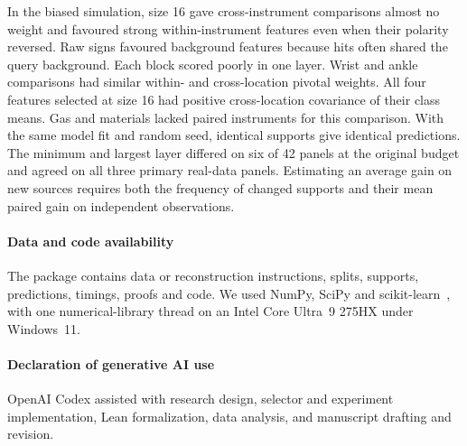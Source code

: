\documentclass{article}
\begin{document}
In the biased simulation, size 16 gave cross-instrument comparisons almost no weight and favoured strong within-instrument features even when their polarity reversed. Raw signs favoured background features because hits often shared the query background. Each block scored poorly in one layer. Wrist and ankle comparisons had similar within- and cross-location pivotal weights. All four features selected at size 16 had positive cross-location covariance of their class means. Gas and materials lacked paired instruments for this comparison. With the same model fit and random seed, identical supports give identical predictions. The minimum and largest layer differed on six of 42 panels at the original budget and agreed on all three primary real-data panels. Estimating an average gain on new sources requires both the frequency of changed supports and their mean paired gain on independent observations.

\paragraph{Data and code availability}
The package contains data or reconstruction instructions, splits, supports, predictions, timings, proofs and code. We used NumPy, SciPy and scikit-learn~\citep{pedregosa2011sklearn}, with one numerical-library thread on an Intel Core Ultra~9 275HX under Windows~11.

\paragraph{Declaration of generative AI use}
OpenAI Codex assisted with research design, selector and experiment implementation, Lean formalization, data analysis, and manuscript drafting and revision.

\begingroup\raggedright

\endgroup
\end{document}
